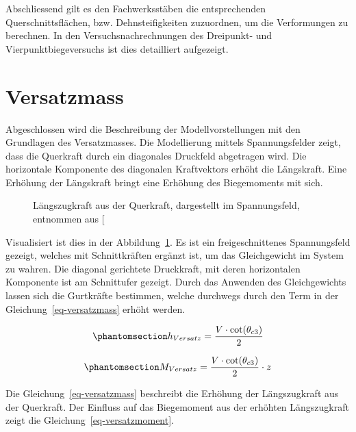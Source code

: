\documentclass[
  12pt,
  letterpaper,
  egregdoesnotlikesansseriftitles]{scrreprt}
\begin{document}
Abschliessend gilt es den Fachwerksstäben die entsprechenden
Querschnittsflächen, bzw. Dehnsteifigkeiten zuzuordnen, um die
Verformungen zu berechnen. In den Versuchsnachrechnungen des Dreipunkt-
und Vierpunktbiegeversuchs ist dies detailliert aufgezeigt.

\section{Versatzmass}\label{sec-versatzmass}

Abgeschlossen wird die Beschreibung der Modellvorstellungen mit den
Grundlagen des Versatzmasses. Die Modellierung mittels Spannungsfelder
zeigt, dass die Querkraft durch ein diagonales Druckfeld abgetragen
wird. Die horizontale Komponente des diagonalen Kraftvektors erhöht die
Längskraft. Eine Erhöhung der Längskraft bringt eine Erhöhung des
Biegemoments mit sich.

\begin{figure}[H]


\caption{\label{fig-laengszug_spf}Längszugkraft aus der Querkraft,
dargestellt im Spannungsfeld, entnommen aus
{[}\citeproc{ref-Thoma2020}{7}{]}}

\end{figure}%

Visualisiert ist dies in der Abbildung~\ref{fig-laengszug_spf}. Es ist
ein freigeschnittenes Spannungsfeld gezeigt, welches mit Schnittkräften
ergänzt ist, um das Gleichgewicht im System zu wahren. Die diagonal
gerichtete Druckkraft, mit deren horizontalen Komponente ist am
Schnittufer gezeigt. Durch das Anwenden des Gleichgewichts lassen sich
die Gurtkräfte bestimmen, welche durchwegs durch den Term in der
Gleichung~\ref{eq-versatzmass} erhöht werden.

\begin{equation}\phantomsection\label{eq-versatzmass}{
h_{Versatz} = \frac{V \cdot \cot(\theta_{c3})}{2}
}\end{equation}

\begin{equation}\phantomsection\label{eq-versatzmoment}{
M_{Versatz} = \frac{V \cdot \cot(\theta_{c3})}{2} \cdot z
}\end{equation}

Die Gleichung~\ref{eq-versatzmass} beschreibt die Erhöhung der
Längszugkraft aus der Querkraft. Der Einfluss auf das Biegemoment aus
der erhöhten Längszugkraft zeigt die Gleichung~\ref{eq-versatzmoment}.
\end{document}

